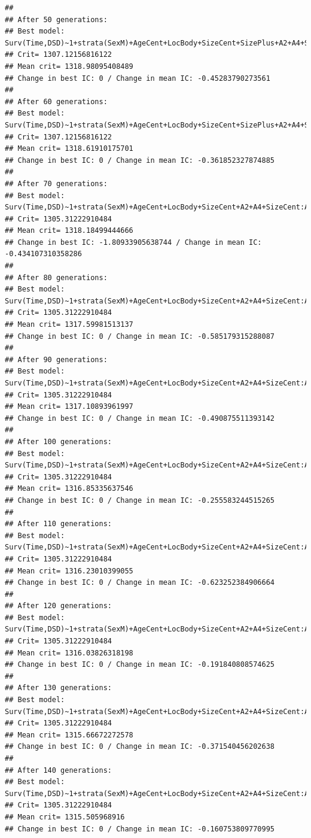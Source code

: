 \documentclass{article}\usepackage[]{graphicx}\usepackage[]{color}
\makeatletter
\newenvironment{kframe}{%
 \def\at@end@of@kframe{}%
 \ifinner\ifhmode%
  \def\at@end@of@kframe{\end{minipage}}%
  \begin{minipage}{\columnwidth}%
 \fi\fi%
 \def\FrameCommand##1{\hskip\@totalleftmargin \hskip-\fboxsep
 \colorbox{shadecolor}{##1}\hskip-\fboxsep
     \hskip-\linewidth \hskip-\@totalleftmargin \hskip\columnwidth}%
 \MakeFramed {\advance\hsize-\width
   \@totalleftmargin\z@ \linewidth\hsize
   \@setminipage}}%
 {\par\unskip\endMakeFramed%
 \at@end@of@kframe}
\newenvironment{knitrout}{}{} %
\makeatother
\begin{document}
\begin{knitrout}
\begin{kframe}
{\ttfamily\noindent\color{warningcolor}{\#\# Warning in fitter(X, Y, strats, offset, init, control, weights = weights, : Loglik converged before variable\ \ 8 ; beta may be infinite.}}\begin{verbatim}
## 
## After 50 generations:
## Best model: Surv(Time,DSD)~1+strata(SexM)+AgeCent+LocBody+SizeCent+SizePlus+A2+A4+SizeCent:AgeCent+strata(SexM):SizeCent
## Crit= 1307.12156816122
## Mean crit= 1318.98095408489
## Change in best IC: 0 / Change in mean IC: -0.45283790273561
## 
## After 60 generations:
## Best model: Surv(Time,DSD)~1+strata(SexM)+AgeCent+LocBody+SizeCent+SizePlus+A2+A4+SizeCent:AgeCent+strata(SexM):SizeCent
## Crit= 1307.12156816122
## Mean crit= 1318.61910175701
## Change in best IC: 0 / Change in mean IC: -0.361852327874885
## 
## After 70 generations:
## Best model: Surv(Time,DSD)~1+strata(SexM)+AgeCent+LocBody+SizeCent+A2+A4+SizeCent:AgeCent+strata(SexM):SizeCent
## Crit= 1305.31222910484
## Mean crit= 1318.18499444666
## Change in best IC: -1.80933905638744 / Change in mean IC: -0.434107310358286
## 
## After 80 generations:
## Best model: Surv(Time,DSD)~1+strata(SexM)+AgeCent+LocBody+SizeCent+A2+A4+SizeCent:AgeCent+strata(SexM):SizeCent
## Crit= 1305.31222910484
## Mean crit= 1317.59981513137
## Change in best IC: 0 / Change in mean IC: -0.585179315288087
## 
## After 90 generations:
## Best model: Surv(Time,DSD)~1+strata(SexM)+AgeCent+LocBody+SizeCent+A2+A4+SizeCent:AgeCent+strata(SexM):SizeCent
## Crit= 1305.31222910484
## Mean crit= 1317.10893961997
## Change in best IC: 0 / Change in mean IC: -0.490875511393142
## 
## After 100 generations:
## Best model: Surv(Time,DSD)~1+strata(SexM)+AgeCent+LocBody+SizeCent+A2+A4+SizeCent:AgeCent+strata(SexM):SizeCent
## Crit= 1305.31222910484
## Mean crit= 1316.85335637546
## Change in best IC: 0 / Change in mean IC: -0.255583244515265
## 
## After 110 generations:
## Best model: Surv(Time,DSD)~1+strata(SexM)+AgeCent+LocBody+SizeCent+A2+A4+SizeCent:AgeCent+strata(SexM):SizeCent
## Crit= 1305.31222910484
## Mean crit= 1316.23010399055
## Change in best IC: 0 / Change in mean IC: -0.623252384906664
## 
## After 120 generations:
## Best model: Surv(Time,DSD)~1+strata(SexM)+AgeCent+LocBody+SizeCent+A2+A4+SizeCent:AgeCent+strata(SexM):SizeCent
## Crit= 1305.31222910484
## Mean crit= 1316.03826318198
## Change in best IC: 0 / Change in mean IC: -0.191840808574625
## 
## After 130 generations:
## Best model: Surv(Time,DSD)~1+strata(SexM)+AgeCent+LocBody+SizeCent+A2+A4+SizeCent:AgeCent+strata(SexM):SizeCent
## Crit= 1305.31222910484
## Mean crit= 1315.66672272578
## Change in best IC: 0 / Change in mean IC: -0.371540456202638
## 
## After 140 generations:
## Best model: Surv(Time,DSD)~1+strata(SexM)+AgeCent+LocBody+SizeCent+A2+A4+SizeCent:AgeCent+strata(SexM):SizeCent
## Crit= 1305.31222910484
## Mean crit= 1315.505968916
## Change in best IC: 0 / Change in mean IC: -0.160753809770995
\end{verbatim}



\end{kframe}
\end{knitrout}
\end{document}
